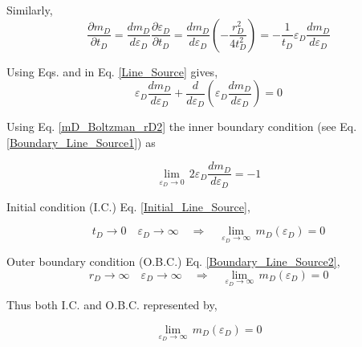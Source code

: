 \documentclass{llncs}
\numberwithin{equation}{section}
\numberwithin{figure}{section}
\numberwithin{table}{section}
\begin{document}
    Similarly,
    \begin{equation}
        \frac{\partial {{m}_{D}}}{\partial {{t}_{D}}}=\frac{d{{m}_{D}}}{d{{\varepsilon }_{D}}}\frac{\partial {{\varepsilon }_{D}}}{\partial {{t}_{D}}}=\frac{d{{m}_{D}}}{d{{\varepsilon }_{D}}}\left( -\frac{r_{D}^{2}}{4t_{D}^{2}} \right)=-\frac{1}{{{t}_{D}}}{{\varepsilon }_{D}}\frac{d{{m}_{D}}}{d{{\varepsilon }_{D}}}
        \label{mD_Boltzman_rD4}
    \end{equation}

    Using Eqs. \label{mD_Boltzman_rD3} and \label{mD_Boltzman_rD4} in Eq. \ref{Line_Source} gives,
    \begin{equation}
    {{\varepsilon }_{D}}\frac{d{{m}_{D}}}{d{{\varepsilon }_{D}}}+\frac{d}{d{{\varepsilon }_{D}}}\left( {{\varepsilon }_{D}}\frac{d{{m}_{D}}}{d{{\varepsilon }_{D}}} \right)=0
        \label{mD_Boltzman_Final}
    \end{equation}

    Using Eq. \ref{mD_Boltzman_rD2}  the inner boundary condition (see Eq. \ref{Boundary_Line_Source1})  as

    \begin{equation}
        \underset{{{\varepsilon }_{D}}\to 0}{\mathop{\lim }}\,2{{\varepsilon }_{D}}\frac{d{{m}_{D}}}{d{{\varepsilon }_{D}}}=-1
        \label{line_source_Boltzman_BC}
    \end{equation}


    Initial condition (I.C.) Eq. \ref{Initial_Line_Source},

    \begin{equation*}
        {{t}_{D}}\to 0\quad {{\varepsilon }_{D}}\to \infty \quad \Rightarrow \quad \underset{{{\varepsilon }_{D}}\to \infty }{\mathop{\lim }}\,{{m}_{D}}\left( {{\varepsilon }_{D}} \right)=0
    \end{equation*}

    Outer boundary condition (O.B.C.) Eq. \ref{Boundary_Line_Source2},
    \begin{equation*}
        {{r}_{D}}\to \infty \quad {{\varepsilon }_{D}}\to \infty \quad \Rightarrow \quad \underset{{{\varepsilon }_{D}}\to \infty }{\mathop{\lim }}\,{{m}_{D}}\left( {{\varepsilon }_{D}} \right)=0
    \end{equation*}

    Thus both I.C. and O.B.C.  represented by,

    \begin{equation}
        \underset{{{\varepsilon }_{D}}\to \infty }{\mathop{\lim }}\,{{m}_{D}}\left( {{\varepsilon }_{D}} \right)=0
        \label{line_source_Boltzman_BC2}
    \end{equation}
\end{document}
